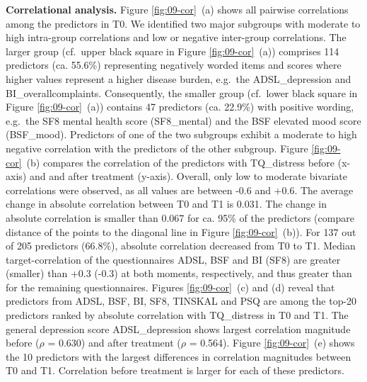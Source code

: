 \documentclass[
  oneside]{book}
\begin{document}
\textbf{Correlational analysis.} Figure \ref{fig:09-cor}~(a) shows all pairwise correlations among the predictors in T0.
We identified two major subgroups with moderate to high intra-group correlations and low or negative inter-group correlations.
The larger group (cf.~upper black square in Figure \ref{fig:09-cor}~(a)) comprises 114 predictors (ca. 55.6\%) representing negatively worded items and scores where higher values represent a higher disease burden, e.g.~the ADSL\_depression and BI\_overallcomplaints.
Consequently, the smaller group (cf.~lower black square in Figure \ref{fig:09-cor}~(a)) contains 47 predictors (ca. 22.9\%) with positive wording, e.g.~the SF8 mental health score (SF8\_mental) and the BSF elevated mood score (BSF\_mood).
Predictors of one of the two subgroups exhibit a moderate to high negative correlation with the predictors of the other subgroup.
Figure \ref{fig:09-cor}~(b) compares the correlation of the predictors with TQ\_distress before (x-axis) and and after treatment (y-axis).
Overall, only low to moderate bivariate correlations were observed, as all values are between -0.6 and +0.6.
The average change in absolute correlation between T0 and T1 is 0.031.
The change in absolute correlation is smaller than 0.067 for ca. 95\% of the predictors (compare distance of the points to the diagonal line in Figure \ref{fig:09-cor}~(b)).
For 137 out of 205 predictors (66.8\%), absolute correlation decreased from T0 to T1.
Median target-correlation of the questionnaires ADSL, BSF and BI (SF8) are greater (smaller) than +0.3 (-0.3) at both moments, respectively, and thus greater than for the remaining questionnaires.
Figures \ref{fig:09-cor}~(c) and (d) reveal that predictors from ADSL, BSF, BI, SF8, TINSKAL and PSQ are among the top-20 predictors ranked by absolute correlation with TQ\_distress in T0 and T1.
The general depression score ADSL\_depression shows largest correlation magnitude before (\(\rho\) = 0.630) and after treatment (\(\rho\) = 0.564).
Figure \ref{fig:09-cor}~(e) shows the 10 predictors with the largest differences in correlation magnitudes between T0 and T1.
Correlation before treatment is larger for each of these predictors.
\end{document}
